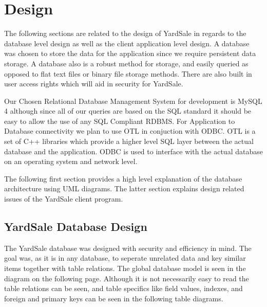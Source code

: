 \documentclass{report}
\begin{document}
\chapter{Design}

    The following sections are related to the design of YardSale
    in regards to the database level design as well as the client
    application level design. A database was chosen to store the
    data for the application since we require persistent data
    storage. A database also is a robust method for storage, and
    easily queried as opposed to flat text files or binary file
    storage methods. There are also built in user access rights
    which will aid in security for YardSale.

    Our Chosen Relational Database Management System for development is
    MySQL 4 although since all of our queries are based on the
    SQL standard it should be easy to allow the use of any
    SQL Compliant RDBMS. For Application to Database connectivity
    we plan to use OTL in conjuction with ODBC. OTL is a set of C++
    libraries which provide a higher level SQL layer between the
    actual database and the application. ODBC is used to interface
    with the actual database on an operating system and network
    level.

    The following first section provides a high level
    explanation of the database architecture using UML diagrams. The
    latter section explains design related issues of the YardSale
    client program.

\section{YardSale Database Design}

    The YardSale database was designed with security and efficiency in
    mind. The goal was, as it is in any database, to seperate unrelated
    data and key similar items together with table relations. The global
    database model is seen in the diagram on the following page. Although
    it is not necessarily easy to read the table relations can be seen, and
    table specifics like field values, indexes, and foreign and primary keys
    can be seen in the following table diagrams.

    \newpage
\end{document}
